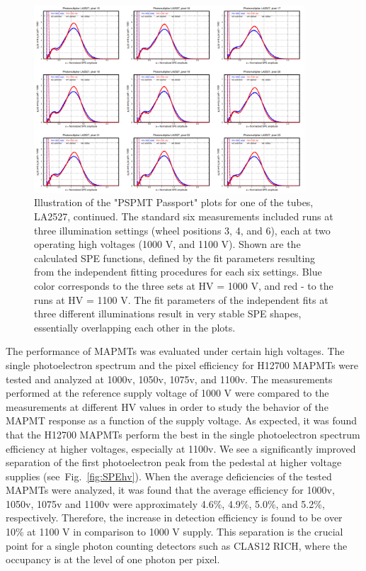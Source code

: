 \begin{figure}[hbt]
	\centering
	\includegraphics[width=0.9\textwidth]{figures/pavel_temp/LA2527_spectra_temp.png}
	\caption{Illustration of the "PSPMT Passport" plots for one of the tubes, LA2527, continued. The standard six measurements included runs at three illumination settings (wheel positions 3, 4, and 6), each at two operating high voltages (1000 V, and 1100 V). Shown are the calculated SPE functions, defined by the fit parameters resulting from the independent fitting procedures for each six settings. Blue color corresponds to the three sets at HV = 1000 V, and red - to the runs at HV = 1100 V. The fit parameters of the independent fits at three different illuminations result in very stable SPE shapes, essentially overlapping each other in the plots.}
	\label{fig:LA2527_passport_spectra}
\end{figure}


\iffalse
The performance of MAPMTs was evaluated under certain high voltages.
The single photoelectron spectrum and the pixel efficiency for H12700 MAPMTs were tested and analyzed at 1000v, 1050v, 1075v, and 1100v.
The measurements performed at the reference supply voltage of 1000 V were compared to the measurements at different HV values in order to study the behavior of the MAPMT response as a function of the supply voltage.
As expected, it was found that the H12700 MAPMTs perform the best in the single photoelectron spectrum efficiency at higher voltages, especially at 1100v.
We see a significantly improved separation of the first photoelectron peak from the pedestal at higher voltage supplies (see~Fig.~\ref{fig:SPEhv}).
When the average deficiencies of the tested MAPMTs were analyzed, it was found that the average efficiency for 1000v, 1050v, 1075v and 1100v were approximately 4.6\%, 4.9\%, 5.0\%, and 5.2\%, respectively.
Therefore, the increase in detection efficiency is found to be over 10\% at 1100 V in comparison to 1000 V supply.
This separation is the crucial point for a single photon counting detectors such as CLAS12 RICH, where the occupancy is at the level of one photon per pixel.




